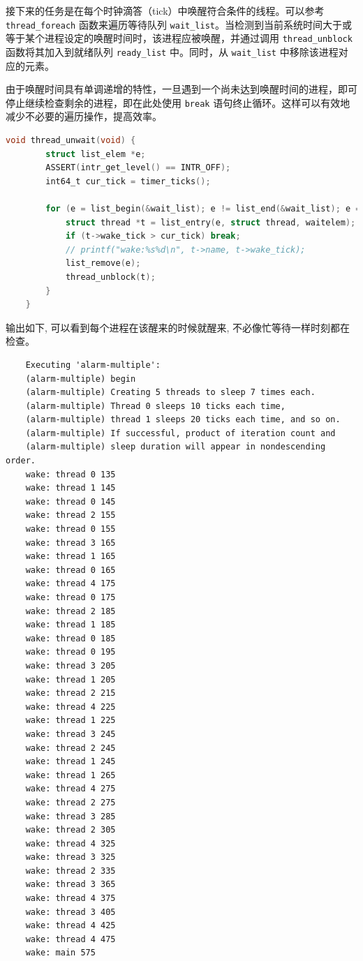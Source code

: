 \documentclass{article}
\begin{document}
接下来的任务是在每个时钟滴答（tick）中唤醒符合条件的线程。可以参考 \texttt{thread\_foreach} 函数来遍历等待队列 \texttt{wait\_list}。当检测到当前系统时间大于或等于某个进程设定的唤醒时间时，该进程应被唤醒，并通过调用 \texttt{thread\_unblock} 函数将其加入到就绪队列 \texttt{ready\_list} 中。同时，从 \texttt{wait\_list} 中移除该进程对应的元素。

由于唤醒时间具有单调递增的特性，一旦遇到一个尚未达到唤醒时间的进程，即可停止继续检查剩余的进程，即在此处使用 \texttt{break} 语句终止循环。这样可以有效地减少不必要的遍历操作，提高效率。

\begin{lstlisting}[language=C, title=\texttt{thread\_unwait}]
	void thread_unwait(void) {
		struct list_elem *e;
		ASSERT(intr_get_level() == INTR_OFF);
		int64_t cur_tick = timer_ticks();
		
		for (e = list_begin(&wait_list); e != list_end(&wait_list); e = list_next(e)) {
			struct thread *t = list_entry(e, struct thread, waitelem);
			if (t->wake_tick > cur_tick) break;
			// printf("wake:%s%d\n", t->name, t->wake_tick);
			list_remove(e);
			thread_unblock(t);
		}
	}
\end{lstlisting}

输出如下, 可以看到每个进程在该醒来的时候就醒来, 不必像忙等待一样时刻都在检查。

\begin{lstlisting}
	Executing 'alarm-multiple':
	(alarm-multiple) begin
	(alarm-multiple) Creating 5 threads to sleep 7 times each.
	(alarm-multiple) Thread 0 sleeps 10 ticks each time,
	(alarm-multiple) thread 1 sleeps 20 ticks each time, and so on.
	(alarm-multiple) If successful, product of iteration count and
	(alarm-multiple) sleep duration will appear in nondescending order.
	wake: thread 0 135
	wake: thread 1 145
	wake: thread 0 145
	wake: thread 2 155
	wake: thread 0 155
	wake: thread 3 165
	wake: thread 1 165
	wake: thread 0 165
	wake: thread 4 175
	wake: thread 0 175
	wake: thread 2 185
	wake: thread 1 185
	wake: thread 0 185
	wake: thread 0 195
	wake: thread 3 205
	wake: thread 1 205
	wake: thread 2 215
	wake: thread 4 225
	wake: thread 1 225
	wake: thread 3 245
	wake: thread 2 245
	wake: thread 1 245
	wake: thread 1 265
	wake: thread 4 275
	wake: thread 2 275
	wake: thread 3 285
	wake: thread 2 305
	wake: thread 4 325
	wake: thread 3 325
	wake: thread 2 335
	wake: thread 3 365
	wake: thread 4 375
	wake: thread 3 405
	wake: thread 4 425
	wake: thread 4 475
	wake: main 575
\end{lstlisting}
\end{document}
